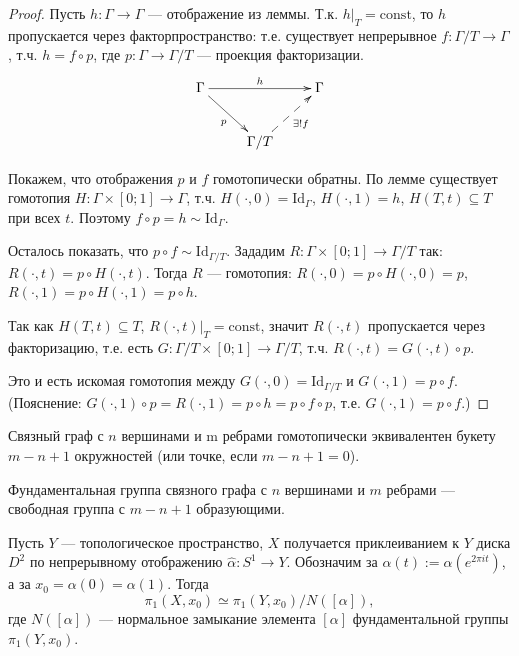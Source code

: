 \documentclass[12pt,a4paper]{article}
\newcommand{\const}{\ensuremath{\mathrm{const}}\xspace}
\newcommand{\Id}{\ensuremath{\mathrm{Id}}\xspace}
\begin{document}
    \begin{proof}
        Пусть $h: \Gamma \to \Gamma$ --- отображение из леммы. Т.к. $h|_T = \const$, то $h$ пропускается через факторпространство: т.е. существует непрерывное $f: \Gamma/T \to \Gamma$, т.ч. $h = f \circ p$, где $p: \Gamma \to \Gamma/T$ --- проекция факторизации.
        \[
            \xymatrix{
                \Gamma \ar[rr]^{h} \ar[rd]_{p} && \Gamma\\
                & \Gamma/T \ar@{-->}[ru]_{\exists! f}
            }
        \]

        Покажем, что отображения $p$ и $f$ гомотопически обратны. По лемме существует гомотопия $H: \Gamma \times [0; 1] \to \Gamma$, т.ч. $H({\cdot}, 0) = \Id_\Gamma$, $H({\cdot}, 1) = h$, $H(T, t) \subseteq T$ при всех $t$. Поэтому $f \circ p = h \sim \Id_\Gamma$.
        
        Осталось показать, что $p \circ f \sim \Id_{\Gamma/T}$. Зададим $R: \Gamma \times [0; 1] \to \Gamma/T$ так: $R({\cdot}, t) = p \circ H({\cdot}, t)$. Тогда $R$ --- гомотопия: $R({\cdot}, 0) = p \circ H({\cdot}, 0) = p$, $R({\cdot}, 1) = p \circ H({\cdot}, 1) = p \circ h$.

        Так как $H(T, t) \subseteq T$, $R({\cdot}, t)|_T = \const$, значит $R({\cdot}, t)$ пропускается через факторизацию, т.е. есть $G: \Gamma/T \times [0; 1] \to \Gamma/T$, т.ч. $R({\cdot}, t) = G({\cdot}, t) \circ p$.

        Это и есть искомая гомотопия между $G({\cdot}, 0) = \Id_{\Gamma/T}$ и $G({\cdot}, 1) = p \circ f$. (Пояснение: $G({\cdot}, 1) \circ p = R({\cdot}, 1) = p \circ h = p \circ f \circ p$, т.е. $G({\cdot}, 1) = p \circ f$.)
    \end{proof}

    \begin{corollary}
        Связный граф с $n$ вершинами и m ребрами гомотопически эквивалентен букету $m - n + 1$ окружностей (или точке, если $m - n + 1 = 0$).
    \end{corollary}

    \begin{corollary}
        Фундаментальная группа связного графа с $n$ вершинами и $m$ ребрами --- свободная группа с $m - n + 1$ образующими.
    \end{corollary}

    \begin{theorem}
        Пусть $Y$ --- топологическое пространство, $X$ получается приклеиванием к $Y$ диска $D^2$ по непрерывному отображению $\widehat{\alpha}: S^1 \to Y$. Обозначим за $\alpha(t) := \widehat{\alpha}(e^{2\pi it})$, а за $x_0 = \alpha(0) = \alpha(1)$. Тогда
        \[\pi_1(X, x_0) \simeq \pi_1(Y , x_0)/N([\alpha]),\]
        где $N([\alpha])$ --- нормальное замыкание элемента $[\alpha]$ фундаментальной группы $\pi_1(Y , x_0)$.
    \end{theorem}
\end{document}
